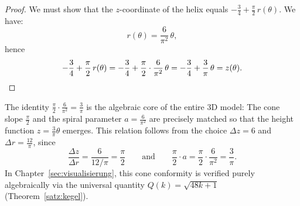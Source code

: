 \begin{proof}
We must show that the $z$-coordinate of the helix equals
$-\tfrac{3}{4} + \tfrac{\pi}{2}\,r(\theta)$. We have:
\[
  r(\theta) = \frac{6}{\pi^2}\,\theta,
\]
hence
\[
  -\frac{3}{4} + \frac{\pi}{2}\,r(\theta)
  = -\frac{3}{4} + \frac{\pi}{2}\cdot\frac{6}{\pi^2}\,\theta
  = -\frac{3}{4} + \frac{3}{\pi}\,\theta
  = z(\theta). \qedhere
\]
\end{proof}

\begin{remark}
The identity $\frac{\pi}{2}\cdot\frac{6}{\pi^2} = \frac{3}{\pi}$ is the
algebraic core of the entire 3D model: The cone slope $\frac{\pi}{2}$
and the spiral parameter $a = \frac{6}{\pi^2}$ are precisely matched
so that the height function $z = \frac{3}{\pi}\theta$ emerges.
This relation follows from the choice $\Delta z = 6$ and
$\Delta r = \frac{12}{\pi}$, since
\[
  \frac{\Delta z}{\Delta r} = \frac{6}{12/\pi} = \frac{\pi}{2}
  \qquad\text{and}\qquad
  \frac{\pi}{2}\cdot a = \frac{\pi}{2}\cdot\frac{6}{\pi^2} = \frac{3}{\pi}.
\]
In Chapter~\ref{sec:visualisierung}, this cone conformity is verified purely
algebraically via the universal quantity $Q(k) = \sqrt{48k+1}$
(Theorem~\ref{satz:kegel}).
\end{remark}
